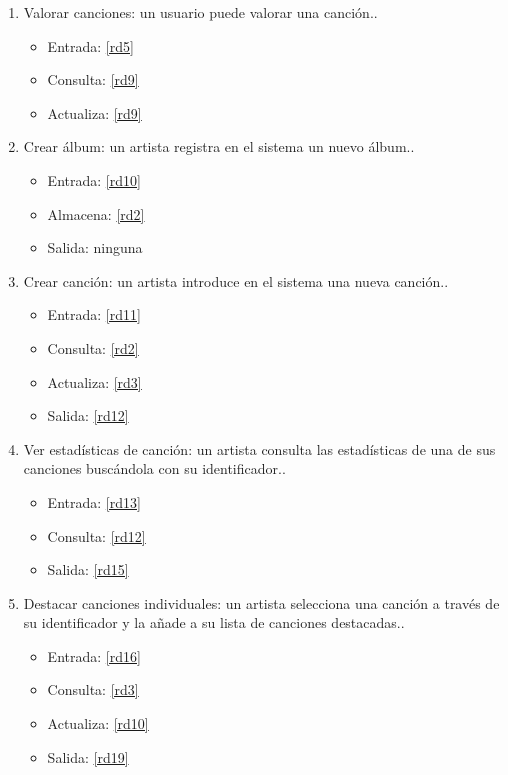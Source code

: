 \documentclass[12pt,a4paper]{article}
\begin{document}
\begin{enumerate}[label=\textnormal{RF\arabic*.}]
	 \item Valorar canciones: un usuario puede valorar una canción.\label{rf6}.
    	\begin{itemize}
			\item Entrada: \ref{rd5}
			\item Consulta: \ref{rd9}
			\item Actualiza: \ref{rd9}
		\end{itemize}
		
		
	 \item Crear álbum: un artista registra en el sistema un nuevo álbum.\label{rf7}.
    	\begin{itemize}
			\item Entrada: \ref{rd10}
			\item Almacena: \ref{rd2}
			\item Salida: ninguna
		\end{itemize}
		
	 \item Crear canción: un artista introduce en el sistema una nueva canción.\label{rf8}.
    	\begin{itemize}
			\item Entrada: \ref{rd11}
			\item Consulta: \ref{rd2}
			\item Actualiza: \ref{rd3}
			\item Salida: \ref{rd12} 
		\end{itemize}
		
	 \item Ver estadísticas de canción: un artista consulta las estadísticas de una de sus canciones buscándola con su identificador.\label{rf9}.
    	\begin{itemize}
			\item Entrada: \ref{rd13}
			\item Consulta: \ref{rd12}
			\item Salida: \ref{rd15}
		\end{itemize}
		
	 \item Destacar canciones individuales: un artista selecciona una canción a través de su identificador y la añade a su lista de canciones destacadas.\label{rf10}.
    	\begin{itemize}
			\item Entrada: \ref{rd16}
			\item Consulta: \ref{rd3}
			\item Actualiza: \ref{rd10}
			\item Salida: \ref{rd19}
		\end{itemize}
		

\end{enumerate}
\end{document}
